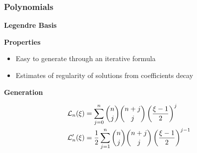 \begin{frame}
    \frametitle{Polynomials}

    \vspace*{\fill}
    \begin{center}
        {\color{\accentcolor} \Large \textbf{Legendre Basis}}
    \end{center}

    \begin{multicols}{2}

        \begin{center}
            {\color{\accentcolor} \Large \textbf{Properties}}
            \vspace*{0.5cm}

            \begin{minipage}{0.4\textwidth}
                \begin{itemize}
                    \item Easy to generate through an iterative formula
                    \item Estimates of regularity of solutions from coefficients decay
                \end{itemize}
            \end{minipage}
        \end{center}

        \vfill\null
        \columnbreak

        \begin{center}
            {\color{\accentcolor} \Large \textbf{Generation}}
            \vspace*{0.125cm}

            \begin{minipage}{0.4\textwidth}
                \begin{align*}
                    \mathcal{L}_n(\xi) &= \sum_{j = 0}^{n} \binom{n}{j} \binom{n + j}{j} \left( \frac{\xi - 1}{2} \right)^{j} \\
                    \mathcal{L}_n^{\prime}(\xi) &= \frac12 \sum_{j = 1}^{n} \binom{n}{j} \binom{n + j}{j} \left( \frac{\xi - 1}{2} \right)^{j - 1}
                \end{align*}
            \end{minipage}
        \end{center}
    \end{multicols}

    \vspace*{\fill}


\end{frame}
